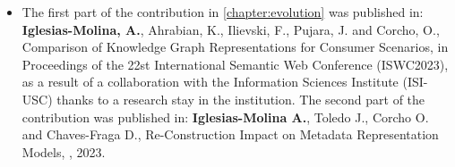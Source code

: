 \begin{itemize}
    \item The first part of the contribution in \cref{chapter:evolution} was published 
    in: \textbf{Iglesias-Molina, A.}, Ahrabian, K., Ilievski, F., Pujara, J. and Corcho, O., Comparison of Knowledge Graph Representations for Consumer Scenarios, in Proceedings of the 22st International Semantic Web Conference (ISWC2023), as a result of a collaboration with the Information Sciences Institute (ISI-USC) thanks to a research stay in the institution.
    The second part of the contribution was published in: \textbf{Iglesias-Molina A.}, Toledo J., Corcho O. and Chaves-Fraga D., Re-Construction Impact on Metadata Representation Models, , 2023.

\end{itemize}